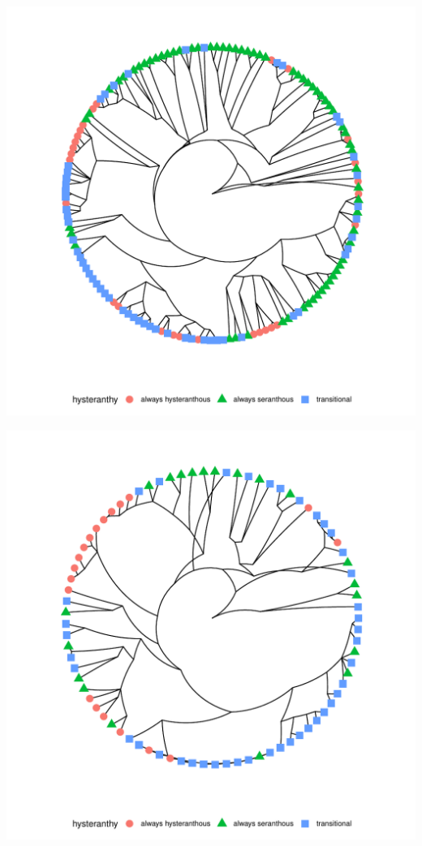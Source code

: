 \documentclass[12pt]{article}\usepackage[]{graphicx}\usepackage[]{color}
\makeatletter
\def\maxwidth{ %
  \ifdim\Gin@nat@width>\linewidth
    \linewidth
  \else
    \Gin@nat@width
  \fi
}
\makeatother
\begin{document}
\pagebreak



\includegraphics[width=\maxwidth]{figure/Code_chunk_Minimal_example3-1} 

\includegraphics[width=\maxwidth]{figure/Code_chunk_Minimal_example3-2} 
\end{document}
